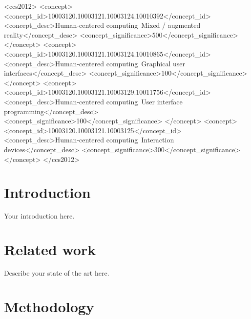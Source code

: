 \documentclass[sigconf]{acmart}
\begin{document}
\begin{CCSXML}
<ccs2012>
   <concept>
       <concept_id>10003120.10003121.10003124.10010392</concept_id>
       <concept_desc>Human-centered computing~Mixed / augmented reality</concept_desc>
       <concept_significance>500</concept_significance>
       </concept>
   <concept>
       <concept_id>10003120.10003121.10003124.10010865</concept_id>
       <concept_desc>Human-centered computing~Graphical user interfaces</concept_desc>
       <concept_significance>100</concept_significance>
       </concept>
   <concept>
       <concept_id>10003120.10003121.10003129.10011756</concept_id>
       <concept_desc>Human-centered computing~User interface programming</concept_desc>
       <concept_significance>100</concept_significance>
       </concept>
   <concept>
       <concept_id>10003120.10003121.10003125</concept_id>
       <concept_desc>Human-centered computing~Interaction devices</concept_desc>
       <concept_significance>300</concept_significance>
       </concept>
 </ccs2012>
\end{CCSXML}

\maketitle


\section{Introduction}

Your introduction here. %


\section{Related work}

Describe your state of the art here. %


\section{Methodology}
\end{document}
